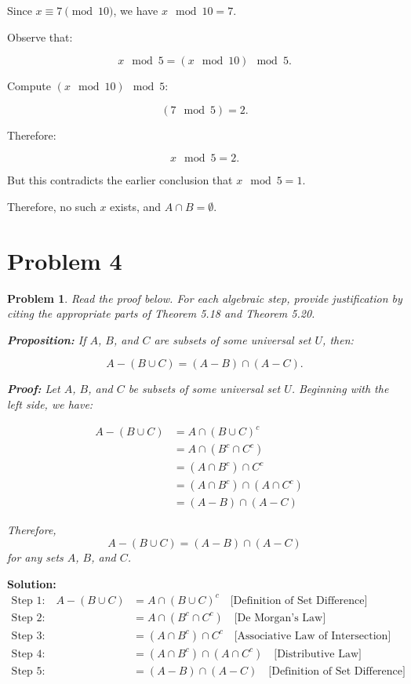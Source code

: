 \documentclass[12pt]{article}
\newtheorem{problem}{Problem}
\theoremstyle{definition}
\begin{document}
\begin{enumerate}[label=(\alph*)]
    Since $x \equiv 7 \pmod{10}$, we have $x \mod 10 = 7$.

    Observe that:

    \[
    x \mod 5 = (x \mod 10) \mod 5.
    \]

    Compute $(x \mod 10) \mod 5$:

    \[
    (7 \mod 5) = 2.
    \]

    Therefore:

    \[
    x \mod 5 = 2.
    \]

    But this contradicts the earlier conclusion that $x \mod 5 = 1$.

    Therefore, no such $x$ exists, and $A \cap B = \emptyset$.
\end{enumerate}

\newpage

\section*{Problem 4}

\begin{problem}
Read the proof below. For each algebraic step, provide justification by citing the appropriate parts of Theorem 5.18 and Theorem 5.20.

\textbf{Proposition:} If $A$, $B$, and $C$ are subsets of some universal set $U$, then:

\[
A - (B \cup C) = (A - B) \cap (A - C).
\]

\textbf{Proof:} Let $A$, $B$, and $C$ be subsets of some universal set $U$. Beginning with the left side, we have:

\begin{align*}
A - (B \cup C) &= A \cap (B \cup C)^{c} \quad \\
&= A \cap (B^{c} \cap C^{c}) \quad \\
&= (A \cap B^{c}) \cap C^{c} \quad \\
&= (A \cap B^{c}) \cap (A \cap C^{c}) \quad \\
&= (A - B) \cap (A - C) \quad 
\end{align*}

Therefore, \[A - (B \cup C) = (A - B) \cap (A - C)\] for any sets $A$, $B$, and $C$.
\end{problem}

\textbf{Solution:}
\begin{align*}
\text{Step 1:}\quad A - (B \cup C) &= A \cap (B \cup C)^{c} \quad \text{[Definition of Set Difference]} \\
\text{Step 2:}\quad &= A \cap (B^{c} \cap C^{c}) \quad \text{[De Morgan's Law]} \\
\text{Step 3:}\quad &= (A \cap B^{c}) \cap C^{c} \quad \text{[Associative Law of Intersection]} \\
\text{Step 4:}\quad &= (A \cap B^{c}) \cap (A \cap C^{c}) \quad \text{[Distributive Law]} \\
\text{Step 5:}\quad &= (A - B) \cap (A - C) \quad \text{[Definition of Set Difference]}
\end{align*}

\newpage
\end{document}
